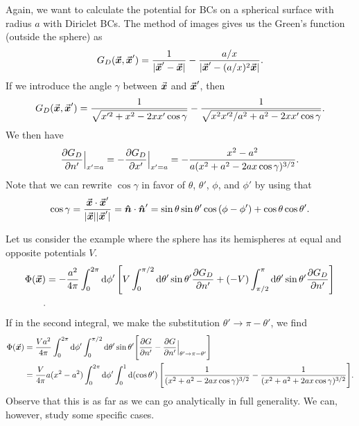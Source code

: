 Again, we want to calculate the potential for BCs on a spherical surface with radius $a$ with Diriclet BCs.
The method of images gives us the Green's function (outside the sphere) as
\begin{eqnarray}
    G_{D}(\va*{x},\va*{x}') = \frac{1}{|\va*{x}' - \va*{x}|} - \frac{a/x}{|\va*{x}' - (a/x)^2\va*{x}|}
.\end{eqnarray}
If we introduce the angle $\gamma$ between $\va*{x}$ and $\va*{x}'$, then
\begin{eqnarray}
    G_{D}(\va*{x},\va*{x}') = \frac{1}{\sqrt{x'^2 + x^2 - 2 x x' \cos{\gamma}}} - \frac{1}{\sqrt{x^2 x'^2/a^2 + a^2 - 2xx' \cos{\gamma}}}
.\end{eqnarray}
We then have
\begin{align}
    \pdv{G_{D}}{n'}\Big|_{x' = a} = - \pdv{G_{D}}{x'}\Big|_{x'=a} = - \frac{x^2 - a^2}{a(x^2 + a^2 - 2ax \cos{\gamma})^{3/2}}
.\end{align}
Note that we can rewrite $\cos{\gamma}$ in favor of $\theta$, $\theta'$, $\phi$, and $\phi'$ by using that
\begin{eqnarray}
    \cos{\gamma} = \frac{\va*{x} \cdot \va*{x}'}{|\va*{x}| |\va*{x}'|} = \vu*{n} \cdot \vu*{n}' = \sin{\theta} \sin{\theta'} \cos{(\phi - \phi')} + \cos{\theta} \cos{\theta'}
.\end{eqnarray}

Let us consider the example where the sphere has its hemispheres at equal and opposite potentials $V$.
\begin{align}
    \label{eq:general-pot-ang}
    \Phi(\va*{x}) &= -\frac{a^2}{4 \pi} \int_{0}^{2\pi} \dd{\phi'} \Bigg[ V \int_{0}^{\pi/2} \dd{\theta'} \sin{\theta'} \pdv{G_{D}}{n'} + (-V) \int_{\pi/2}^{\pi} \dd{\theta'} \sin{\theta'} \pdv{G_{D}}{n'} \Bigg]\nonumber \\
.\end{align}
If in the second integral, we make the substitution $\theta' \rightarrow \pi - \theta'$, we find
\begin{align}
    \Phi(\va*{x}) &= \frac{Va^2}{4 \pi} \int_{0}^{2\pi} \dd{\phi'} \int_{0}^{\pi/2} \dd{\theta'} \sin{\theta'} \Bigg[ \pdv{G}{n'} - \pdv{G}{n'}\Big|_{\theta' \rightarrow \pi - \theta'} \Bigg] \nonumber \\
    &= \frac{V}{4 \pi} a(x^2 - a^2) \int_{0}^{2 \pi} \dd{\phi'} \int_{0}^{1} \dd{(\cos{\theta'})} \Bigg[ \frac{1}{(x^2 + a^2 - 2ax \cos{\gamma})^{3/2}} - \frac{1}{(x^2 + a^2 + 2ax \cos{\gamma})^{3/2}} \Bigg]
.\end{align}
Observe that this is as far as we can go analytically in full generality.
We can, however, study some specific cases.

